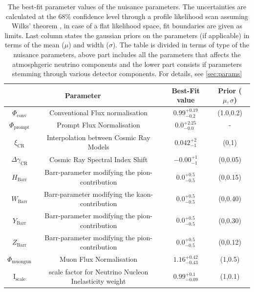  
\begin{table}[h]
    \caption{The best-fit parameter values of the nuisance parameters. The uncertainties are calculated at the 68\% confidence level through a profile likelihood scan assuming Wilks' theorem \cite{Wilks_thm}, in case of a flat likelihood space, fit boundaries are given as limits. Last column states the gaussian priors on the parameters (if applicable) in terms of the mean ($\mu$) and width ($\sigma$). The table is divided in terms of type of the nuisance parameters, above part includes all the parameters that affects the atmosphgeric neutrino components and the lower part consists if parameters stemming through various detector components. For details, see \ref{sec:params}}
    {\renewcommand{\arraystretch}{1.4}
    \begin{tabular}{ c c |c|c}
        \hline
        \multicolumn{2}{c|}{Parameter}  & Best-Fit value & Prior ($\mu,\sigma$)\\
        \hline
        \hline
        $\Phi_{\mathrm{conv}}$& Conventional Flux normalisation & $0.99_{-0.2}^{+0.19}$ & (1.0,0.2)\\
        \hline
        $\Phi_{\mathrm{prompt}}$& Prompt Flux Normalisation & ${0.0}_{-0.0}^{+2.25}$ & - \\
        \hline
        $\xi_{\mathrm{CR}}$& Interpolation between Cosmic Ray Models & $0.042_{-1}^{+2}$ & (0,1)\\
        \hline
        $\Delta\gamma_{\mathrm{CR}}$& Cosmic Ray Spectral Index Shift & $-0.00_{-1}^{+1}$ & (0,0.05)\\
        \hline
        $H_{\mathrm{Barr}}$& Barr-parameter modifying the pion-contribution & $0.0_{-0.5}^{+0.5}$ & (0,0.15)\\
        \hline
        $W_{\mathrm{Barr}}$& Barr-parameter modifying the kaon-contribution & $0.0_{-0.5}^{+0.5}$ & (0,0.40)\\
        \hline
        $Y_{\mathrm{Barr}}$& Barr-parameter modifying the pion-contribution & $0.0_{-0.5}^{+0.5}$ & (0,0.30)\\
        \hline
        $Z_{\mathrm{Barr}}$& Barr-parameter modifying the pion-contribution & $0.0_{-0.5}^{+0.5}$ & (0,0.12)\\
        \hline
        $\Phi_{\mathrm{muongun}}$ & Muon Flux Normalisation & $1.16_{-0.43}^{+0.42}$ & (1,0.5)\\
        \hline
        $\mathrm{I}_{\mathrm{scale}}$ & scale factor for Neutrino Nucleon Inelasticity weight & $0.99_{-0.09}^{+0.1}$ & (1,0.1)\\
        \hline
        

\end{tabular}}
\end{table}
